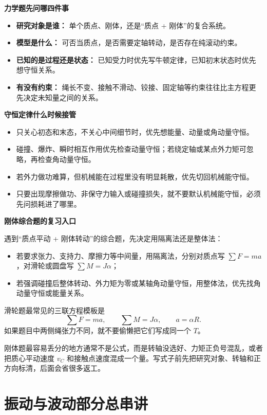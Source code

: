 \documentclass[lang=cn,11pt]{elegantbook}
\begin{document}
\textbf{力学题先问哪四件事}

\begin{itemize}
  \item \textbf{研究对象是谁：} 单个质点、刚体，还是“质点 + 刚体”的复合系统。
  \item \textbf{模型是什么：} 可否当质点，是否需要定轴转动，是否存在纯滚动约束。
  \item \textbf{已知的是过程还是状态：} 已知受力时优先写牛顿定律，已知初末状态时优先想守恒关系。
  \item \textbf{有没有约束：} 绳长不变、接触不滑动、铰接、固定轴等约束往往比主方程更先决定未知量之间的关系。
\end{itemize}

\textbf{守恒定律什么时候接管}

\begin{itemize}
  \item 只关心初态和末态，不关心中间细节时，优先想能量、动量或角动量守恒。
  \item 碰撞、爆炸、瞬时相互作用优先检查动量守恒；若绕定轴或某点外力矩可忽略，再检查角动量守恒。
  \item 若外力做功难算，但机械能在过程里没有明显耗散，优先切回机械能守恒。
  \item 只要出现摩擦做功、非保守力输入或碰撞损失，就不要默认机械能守恒，必须先问损耗进了哪里。
\end{itemize}

\textbf{刚体综合题的复习入口}

遇到“质点平动 + 刚体转动”的综合题，先决定用隔离法还是整体法：
\begin{itemize}
  \item 若要求张力、支持力、摩擦力等中间量，用隔离法，分别对质点写 \(\sum F=ma\)，对滑轮或圆盘写 \(\sum M=J\alpha\)；
  \item 若强调碰撞后整体转动、外力矩为零或某轴角动量守恒，用整体法，优先找角动量守恒或能量关系。
\end{itemize}

滑轮题最常见的三联方程模板是
\[
\sum F=ma,\qquad \sum M=J\alpha,\qquad a=\alpha R.
\]
如果题目中两侧绳张力不同，就不要偷懒把它们写成同一个 \(T\)。

\begin{remark}
刚体题最容易丢分的地方通常不是公式，而是转轴没选好、力矩正负号混乱，或者把质心平动速度 \(v_C\) 和接触点速度混成一个量。写式子前先把研究对象、转轴和正方向标清，后面会省很多返工。
\end{remark}

\section{振动与波动部分总串讲}
\end{document}
